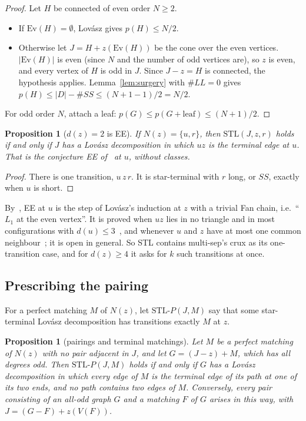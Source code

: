 \documentclass[11pt]{amsart}
\newtheorem{proposition}[theorem]{Proposition}
\theoremstyle{definition}
\newcommand{\Ev}{\mathrm{Ev}}
\newcommand{\STL}{\mathrm{STL}}
\begin{document}
\begin{proof}
Let $H$ be connected of even order $N\ge2$.
\begin{itemize}
\item If $\Ev(H)=\emptyset$, Lov\'asz gives $p(H)\le N/2$.
\item Otherwise let $J=H+z(\Ev(H))$ be the cone over the even vertices. $|\Ev(H)|$ is even
(since $N$ and the number of odd vertices are), so $z$ is even, and every vertex of $H$ is odd in
$J$. Since $J-z=H$ is connected, the hypothesis applies. Lemma~\ref{lem:surgery} with $\#LL=0$
gives $p(H)\le|D|-\#SS\le(N+1-1)/2=N/2$.
\end{itemize}
For odd order $N$, attach a leaf: $p(G)\le p(G+\text{leaf})\le(N+1)/2$.
\end{proof}

\begin{proposition}[$d(z)=2$ is EE]\label{prop:EE}
If $N(z)=\{u,r\}$, then $\STL(J,z,r)$ holds if and only if $J$ has a Lov\'asz decomposition in which
$uz$ is the terminal edge at $u$. That is the conjecture EE of~\cite[Conj.~17]{MS} at $u$, without classes.
\end{proposition}

\begin{proof}
There is one transition, $u\,z\,r$. It is star-terminal with $r$ long, or $SS$, exactly when $u$
is short.
\end{proof}

By~\cite[Prop.~16]{MS}, EE at $u$ is the step of Lov\'asz's induction at $z$ with a trivial Fan
chain, i.e.\ ``$L_1$ at the even vertex''. It is proved when $uz$ lies in no triangle and in most
configurations with $d(u)\le3$~\cite[Prop.~18]{MS}, and whenever $u$ and $z$ have at most one common
neighbour~\cite{PE}; it is open in general. So STL contains multi-sep's crux as its one-transition
case, and for $d(z)\ge4$ it asks for $k$ such transitions at once.

\subsection{Prescribing the pairing}
For a perfect matching $M$ of $N(z)$, let $\STL\text{-}P(J,M)$ say that some star-terminal Lov\'asz
decomposition has transitions exactly $M$ at $z$.

\begin{proposition}[pairings and terminal matchings]\label{prop:PTM}
Let $M$ be a perfect matching of $N(z)$ with no pair adjacent in $J$, and let $G=(J-z)+M$, which
has all degrees odd. Then $\STL\text{-}P(J,M)$ holds if and only if $G$ has a Lov\'asz
decomposition in which every edge of $M$ is the terminal edge of its path at one of its two ends,
and no path contains two edges of $M$. Conversely, every pair consisting of an all-odd graph $G$
and a matching $F$ of $G$ arises in this way, with $J=(G-F)+z(V(F))$.
\end{proposition}
\end{document}
